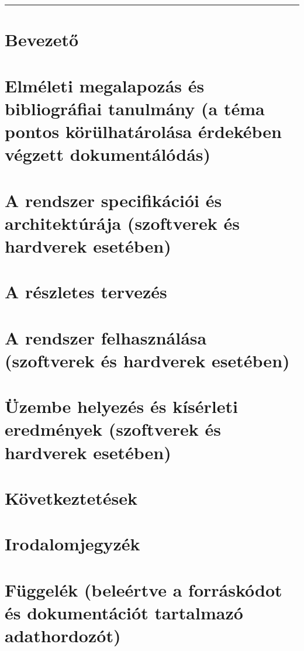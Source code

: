 \documentclass{article}
\begin{document}
\rule[10pt]{\textwidth}{1pt}
\renewcommand{\contentsname}{Tartalomjegyzék}
\tableofcontents
\thispagestyle{empty}


\cleardoublepage
\setcounter{page}{1}

\section{Bevezető}\label{sec:intro}

\section{Elméleti megalapozás és bibliográfiai tanulmány (a téma pontos körülhatárolása érdekében végzett dokumentálódás)}\label{sec:bibl}

\section{A rendszer specifikációi és architektúrája (szoftverek és hardverek esetében)}\label{sec:specs_and_arch}

\section{A részletes tervezés}\label{sec:plan}

\section{A rendszer felhasználása (szoftverek és hardverek esetében)}\label{sec:useage}

\section{Üzembe helyezés és kísérleti eredmények (szoftverek és hardverek esetében)}\label{sec:testcases}

\section{Következtetések}\label{sec:conc}

\section{Irodalomjegyzék}\label{sec:irod}

\section{Függelék (beleértve a forráskódot és dokumentációt tartalmazó adathordozót)}\label{sec:dep}
\end{document}
